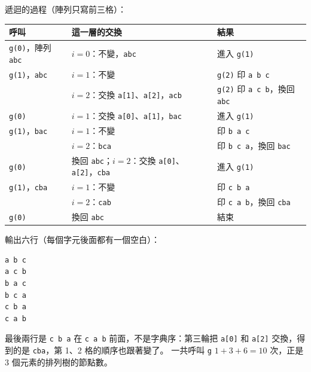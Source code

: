 \begin{pastsoln}
遞迴的過程（陣列只寫前三格）：
\begin{center}
\small
\begin{tabular}{lll}
\toprule
呼叫 & 這一層的交換 & 結果 \\
\midrule
\texttt{g(0)}，陣列 \texttt{abc} & $i = 0$：不變，\texttt{abc} & 進入 \texttt{g(1)} \\
\quad \texttt{g(1)}，\texttt{abc} & $i = 1$：不變 & \texttt{g(2)} 印 \texttt{a b c} \\
 & $i = 2$：交換 \texttt{a[1]}、\texttt{a[2]}，\texttt{acb} & \texttt{g(2)} 印 \texttt{a c b}，換回 \texttt{abc} \\
\texttt{g(0)} & $i = 1$：交換 \texttt{a[0]}、\texttt{a[1]}，\texttt{bac} & 進入 \texttt{g(1)} \\
\quad \texttt{g(1)}，\texttt{bac} & $i = 1$：不變 & 印 \texttt{b a c} \\
 & $i = 2$：\texttt{bca} & 印 \texttt{b c a}，換回 \texttt{bac} \\
\texttt{g(0)} & 換回 \texttt{abc}；$i = 2$：交換 \texttt{a[0]}、\texttt{a[2]}，\texttt{cba} & 進入 \texttt{g(1)} \\
\quad \texttt{g(1)}，\texttt{cba} & $i = 1$：不變 & 印 \texttt{c b a} \\
 & $i = 2$：\texttt{cab} & 印 \texttt{c a b}，換回 \texttt{cba} \\
\texttt{g(0)} & 換回 \texttt{abc} & 結束 \\
\bottomrule
\end{tabular}
\end{center}

輸出六行（每個字元後面都有一個空白）：

\begin{verbatim}
a b c
a c b
b a c
b c a
c b a
c a b
\end{verbatim}
\noindent 最後兩行是 \texttt{c b a} 在 \texttt{c a b} 前面，不是字典序：第三輪把 \texttt{a[0]} 和
\texttt{a[2]} 交換，得到的是 \texttt{cba}，第 1、2 格的順序也跟著變了。 一共呼叫 \texttt{g}
$1 + 3 + 6 = 10$ 次，正是 $3$ 個元素的排列樹的節點數。
\end{pastsoln}
